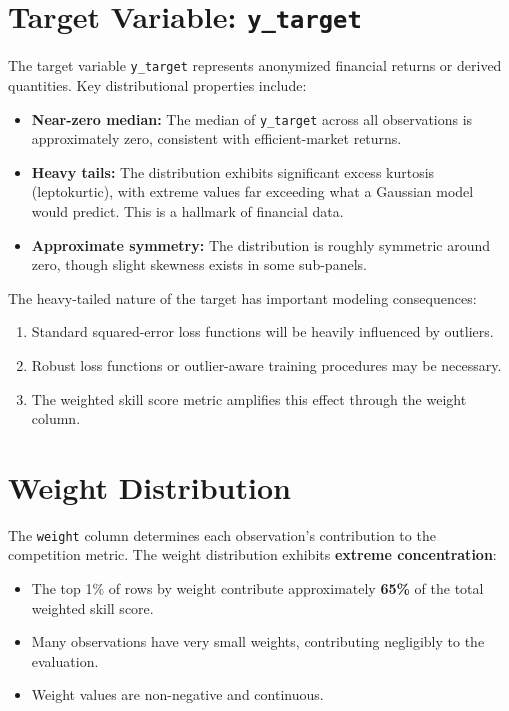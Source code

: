 \section{Target Variable: \texttt{y\_target}}

The target variable \texttt{y\_target} represents anonymized financial returns or derived quantities. Key distributional properties include:

\begin{itemize}
    \item \textbf{Near-zero median:} The median of \texttt{y\_target} across all observations is approximately zero, consistent with efficient-market returns.
    \item \textbf{Heavy tails:} The distribution exhibits significant excess kurtosis (leptokurtic), with extreme values far exceeding what a Gaussian model would predict. This is a hallmark of financial data.
    \item \textbf{Approximate symmetry:} The distribution is roughly symmetric around zero, though slight skewness exists in some sub-panels.
\end{itemize}

The heavy-tailed nature of the target has important modeling consequences:
\begin{enumerate}
    \item Standard squared-error loss functions will be heavily influenced by outliers.
    \item Robust loss functions or outlier-aware training procedures may be necessary.
    \item The weighted skill score metric amplifies this effect through the weight column.
\end{enumerate}

\section{Weight Distribution}
\label{sec:weight_dist}

The \texttt{weight} column determines each observation's contribution to the competition metric. The weight distribution exhibits \textbf{extreme concentration}:

\begin{itemize}
    \item The top 1\% of rows by weight contribute approximately \textbf{65\%} of the total weighted skill score.
    \item Many observations have very small weights, contributing negligibly to the evaluation.
    \item Weight values are non-negative and continuous.
\end{itemize}

